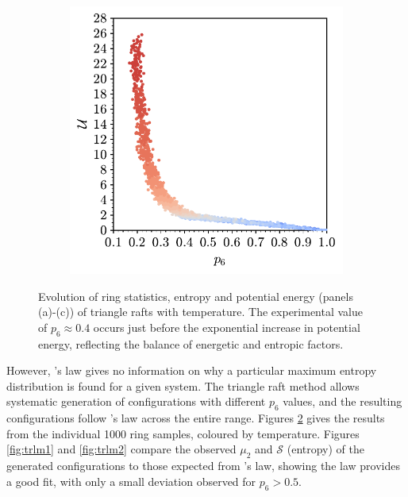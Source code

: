 \begin{figure}[bt]
     \vspace{2mm}
     \begin{subfigure}[b]{0.45\textwidth}
         \centering
         \includegraphics[width=\textwidth]{./figures/bilayers/tri_raft_lm_2.pdf}
         \caption{}
         \label{fig:trlm3}
     \end{subfigure}
     \hfill

     \caption{Evolution of ring statistics, entropy and potential energy (panels (a)-(c)) of triangle rafts with temperature. The experimental value of $p_6\approx 0.4$ occurs just before the exponential increase in potential energy, reflecting the balance of energetic and entropic factors.}
     \label{fig:trlm}
\end{figure}


However, \lm's law gives no information on why a particular maximum entropy distribution is found for a given system.
The triangle raft method allows systematic generation of configurations with different $p_6$ values, and the resulting configurations follow \lm's law across the entire range.
Figures \ref{fig:trlm} gives the results from the individual 1000 ring samples, coloured by temperature.
Figures \ref{fig:trlm1} and \ref{fig:trlm2} compare the observed $\mu_2$ and $\mathcal{S}$ (entropy) of the generated configurations to those expected from \lm's law, showing the law provides a good fit, with only a small deviation observed for $p_6>0.5$. 

